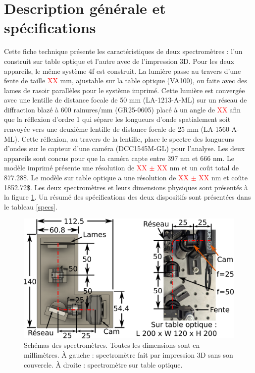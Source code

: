 \documentclass[11pt,letterpaper]{article}
\begin{document}
\section{Description générale et spécifications}

Cette fiche technique présente les caractéristiques de deux spectromètres : l'un construit sur 
table optique et l'autre avec de l'impression 3D. Pour les deux appareils, le même système 4f
est construit. La lumière passe au travers d'une fente de taille \textcolor{red}{XX} mm, 
ajustable sur la table optique (VA100), ou faite avec des lames de rasoir parallèles pour le
système imprimé. Cette lumière est convergée avec une lentille de distance focale de 50 mm 
(LA-1213-A-ML) sur un réseau de diffraction blazé à 600 rainures/mm (GR25-0605) placé à un
angle de \textcolor{red}{XX}\degree $\;$afin que la réflexion d'ordre 1 qui sépare les
longueurs d'onde spatialement soit renvoyée vers une deuxième lentille de distance focale
de 25 mm (LA-1560-A-ML). Cette réflexion, au travers de la lentille, place le spectre des 
longueurs d'ondes sur le capteur d'une caméra (DCC1545M-GL) pour l'analyse. Les deux appareils
sont concus pour que la caméra capte entre 397 nm et 666 nm. Le modèle imprimé présente une
résolution de \textcolor{red}{XX $\pm$ XX} nm et un coût total de 877.28\$. Le modèle sur
table optique a une résolution de \textcolor{red}{XX $\pm$ XX} nm et coûte 1852.72\$. Les
deux spectromètres et leurs dimensions physiques sont présentés à la figure 
\ref{schema_spectros}. Un résumé des spécifications des deux dispositifs sont présentées dans le tableau \ref{specs}. 


\begin{figure}[H]
  \centering
  \includegraphics[scale=1.75]{schema_spectros.png}
  \caption{Schémas des spectromètres. Toutes les dimensions sont en millimètres. À gauche : spectromètre fait par impression 3D sans son couvercle. À droite : spectromètre sur table optique.}
  \label{schema_spectros}
\end{figure}
\end{document}
